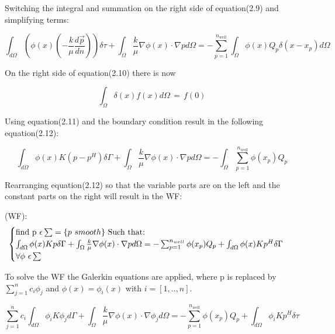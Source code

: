 \documentclass{report}
\begin{document}
Switching the integral and summation on the right side of equation(2.9) and simplifying terms:

\begin{equation}
	\int_{d\Omega}(\phi(x)(-\frac{k}{\mu}\frac{d\vec{p}}{dn}))\delta\tau+\int_{\Omega}\frac{k}{\mu}\nabla\phi(x)\cdot\nabla p d\Omega= -\sum_{p=1}^{n_{well}}\int_{\Omega}\phi(x) Q_p\delta(x-x_p)d\Omega
\end{equation}


On the right side of equation(2.10) there is now 

\begin{equation}
	\int_{\Omega}\delta(x)f(x)d\Omega \, = \, f(0)	
\end{equation}

Using equation(2.11) and the boundary condition result in the following equation(2.12):

\begin{equation}
	\int_{d\Omega}\phi(x)K(p-p^H)\delta\Gamma+\int_{\Omega}\frac{k}{\mu}\nabla\phi(x)\cdot\nabla p d\Omega= -\int_{\Omega}\sum_{p=1}^{n_{well}}\phi(x_p) Q_p
\end{equation}	

Rearranging equation(2.12) so that the variable parts are on the left and the constant parts on the right will result in the WF: \vspace{5mm}


(WF): \begin{equation}
		\begin{cases} 
			$find p $\epsilon \sum =\{p$ $ smooth\}$ Such that:$ \\
			\int_{d\Omega}\phi(x)Kp\delta\Gamma+\int_{\Omega}\frac{k}{\mu}\nabla\phi(x)\cdot\nabla p d\Omega= -\sum_{p=1}^{n_{well}}\phi(x_p) Q_p +\int_{d\Omega}\phi(x)Kp^H\delta\Gamma\\ \forall\phi $ $ \epsilon\sum 
		\end{cases}\  
	\end{equation}

To solve the WF the Galerkin equations are applied, where p is replaced by $ \sum_{j=1}^{n}c_i\phi_j $ and  $\phi(x)=\phi_i(x)$ with $i = [1,..,n]$.

\begin{equation}
	\sum_{j=1}^{n}c_i\int_{d\Omega}\phi_i K\phi_j d\Gamma + \int_{\Omega}\frac{k}{\mu}\nabla\phi(x)\cdot\nabla \phi_j d\Omega= -\sum_{p=1}^{n_{well}}\phi(x_p) Q_p +\int_{d\Omega}\phi_i Kp^H\delta\tau
\end{equation}
\end{document}
